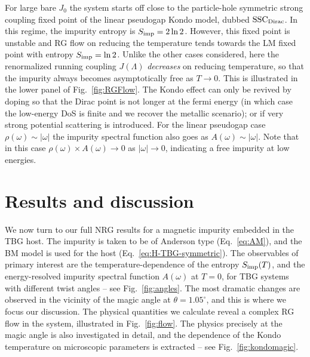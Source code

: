 For large bare $J_0$ the system starts off close to the particle-hole symmetric strong coupling fixed point of the linear pseudogap Kondo model, dubbed $\rm{SSC}_{\rm{Dirac}}$. In this regime, the impurity entropy is $S_{\rm{imp}}=2 \ln 2$. However, this fixed point is unstable and RG flow on reducing the temperature tends towards the LM fixed point with entropy $S_{\rm{imp}}=\ln 2$. Unlike the other cases considered, here the renormalized running coupling $J(\Lambda)$ \emph{decreases} on reducing temperature, so that the impurity always becomes asymptotically free as $T\to 0$. This is illustrated in the lower panel of  Fig.~\ref{fig:RGFlow}. The Kondo effect can only be revived by doping so that the Dirac point is not longer at the fermi energy (in which case the low-energy DoS is finite and we recover the metallic scenario); or if very strong potential scattering is introduced.
For the linear pseudogap case $\rho(\omega)\sim |\omega|$ the impurity spectral function also goes as $A(\omega)\sim |\omega|$. Note that in this case $\rho(\omega)\times A(\omega) \to 0$ as $|\omega|\to 0$, indicating a free impurity at low energies.




\section{Results and discussion}\label{sec:Kondo-BM}
We now turn to our full NRG results for a magnetic impurity embedded in the TBG host. The impurity is taken to be of Anderson type (Eq.~\ref{eq:AM}), and the BM model is used for the host (Eq.~\ref{eq:H-TBG-symmetric}). The observables of primary interest are the temperature-dependence of the entropy $S_{\rm imp}(T)$, and the energy-resolved impurity spectral function $A(\omega)$ at $T=0$, for TBG systems with different twist angles  -- see Fig.~\ref{fig:angles}. The most dramatic changes are observed in the vicinity of the magic angle at $\theta=1.05^{\circ}$, and this is where we focus our discussion. The physical quantities we calculate reveal a complex RG flow in the system, illustrated in Fig.~\ref{fig:flow}. The physics precisely at the magic angle is also investigated in detail, and the dependence of the Kondo temperature on microscopic parameters is extracted -- see Fig.~\ref{fig:kondomagic}.



